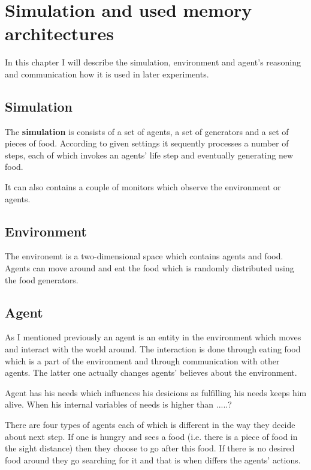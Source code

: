 \chapter{Simulation and used memory architectures}

In this chapter I will describe the simulation, environment and agent's reasoning and communication how it is used in later experiments. 

\section{Simulation}

The {\bf simulation} is consists of a set of agents, a set of generators and a set of pieces of food. According to given settings it sequently processes a number of steps, each of which invokes an agents' life step and eventually generating new food.

It can also contains a couple of monitors which observe the environment or agents.

\section{Environment}

The environemt is a two-dimensional space which contains agents and food. Agents can move around and eat the food which is randomly distributed using the food generators. 

\section{Agent}                                                      

As I mentioned previously an agent is an entity in the environment which moves and interact with the world around. The interaction is done through eating food which is a part of the environment and through communication with other agents. The latter one actually changes agents' believes about the environment.

Agent has his needs which influences his desicions as fulfilling his needs keeps him alive. When his internal variables of needs is higher than .....?

There are four types of agents each of which is different in the way they decide about next step. If one is hungry and sees a food (i.e. there is a piece of food in the sight distance) then they choose to go after this food. If there is no desired food around they go searching for it and that is when differs the agents' actions.

